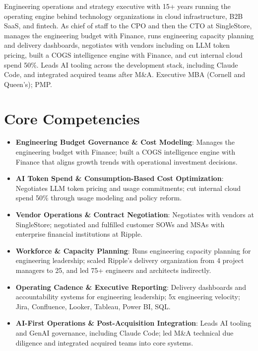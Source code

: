 \documentclass[11pt,letterpaper,sans]{moderncv}
\begin{document}
\makecvtitle


\vspace{6pt}
\small{Engineering operations and strategy executive with 15+ years running the operating engine behind technology organizations in cloud infrastructure, B2B SaaS, and fintech. As chief of staff to the CPO and then the CTO at SingleStore, manages the engineering budget with Finance, runs engineering capacity planning and delivery dashboards, negotiates with vendors including on LLM token pricing, built a COGS intelligence engine with Finance, and cut internal cloud spend 50\%. Leads AI tooling across the development stack, including Claude Code, and integrated acquired teams after M\&A. Executive MBA (Cornell and Queen's); PMP.}


\section{Core Competencies}
\vspace{1pt}
\begin{itemize}

\item \textbf{Engineering Budget Governance \& Cost Modeling}: Manages the engineering budget with Finance; built a COGS intelligence engine with Finance that aligns growth trends with operational investment decisions.

\item \textbf{AI Token Spend \& Consumption-Based Cost Optimization}: Negotiates LLM token pricing and usage commitments; cut internal cloud spend 50\% through usage modeling and policy reform.

\item \textbf{Vendor Operations \& Contract Negotiation}: Negotiates with vendors at SingleStore; negotiated and fulfilled customer SOWs and MSAs with enterprise financial institutions at Ripple.

\item \textbf{Workforce \& Capacity Planning}: Runs engineering capacity planning for engineering leadership; scaled Ripple's delivery organization from 4 project managers to 25, and led 75+ engineers and architects indirectly.

\item \textbf{Operating Cadence \& Executive Reporting}: Delivery dashboards and accountability systems for engineering leadership; 5x engineering velocity; Jira, Confluence, Looker, Tableau, Power BI, SQL.

\item \textbf{AI-First Operations \& Post-Acquisition Integration}: Leads AI tooling and GenAI governance, including Claude Code; led M\&A technical due diligence and integrated acquired teams into core systems.

\end{itemize}
\end{document}
